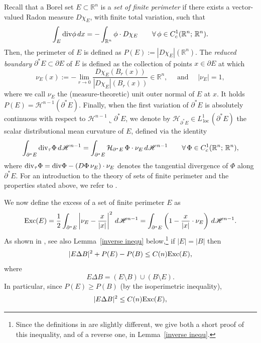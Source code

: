 \documentclass[reqno,11pt]{amsart}
\def\loc{{\mathop\mathrm{\,loc\,}}}
\numberwithin{equation}{section}
\theoremstyle{remark}
\begin{document}
Recall that a Borel set $E\subset \mathbb R^n$ is a \emph{set of finite perimeter} if there exists a vector-valued Radon measure $D\chi_E$, with finite total variation,  such that 
$$\int_{E}{\rm div} \phi\, dx=- \int_{\mathbb R^n} \phi \cdot D\chi_{E}\qquad \forall\, \phi\in C_c^1(\mathbb R^n;\,\mathbb R^n). $$
Then, the perimeter of $E$ is defined as $P(E):=|D\chi_E|(\mathbb R^n)$. 
The \emph{reduced boundary} $\partial^*E\subset\partial E$ of $E$ is defined as the collection of points 
$x\in \partial E$ at which
$$\nu_E(x):=-\lim_{r\to 0} \frac{D\chi_E(B_r(x))}{|D\chi_E|(B_r(x))}\in \mathbb R^n, \quad \text{ and } \quad |\nu_E|=1,$$
where we call $\nu_E$ the (measure-theoretic) unit outer normal of $E$ at $x$. 
It holds $P(E)=\mathscr H^{n-1}(\partial^*E)$.
Finally, when the first variation of $\partial^*E$ is absolutely continuous with respect to $\mathscr H^{n-1}\llcorner\partial^*E$, we denote by
$\mathcal H_{\partial^* E}\in L^1_\loc(\partial^* E)$ the scalar distributional mean curvature of $E$, defined via the identity
$$\int_{\partial^* E} {\rm div}_\tau \Phi \, d\mathscr H^{n-1} = \int_{\partial^* E} \mathcal H_{\partial^* E} \, \Phi\cdot \nu_E\, d\mathscr H^{n-1} \qquad \forall\, \Phi\in C_c^1(\mathbb R^n;\,\mathbb R^n), $$
where 
${\rm div}_\tau \Phi = {\rm div} \Phi - (D\Phi\, \nu_E) \cdot \nu_E$
denotes the tangential divergence of $\Phi$ along $\partial^*E$.
For an introduction to the theory of sets of finite perimeter and the properties stated above, we refer to  \cite[Sections 12-15]{M2012}.

\smallskip


We now define the excess of a set of finite perimeter $E$ as
$${\rm Exc}(E)=\frac{1}{2}\int_{\partial^*E} \left|\nu_E - \frac{x}{|x|}\right|^2 \, d\mathscr H^{n-1}=\int_{\partial^*E} \left(1- \frac{x}{|x|}\cdot \nu_E \right) \, d\mathscr H^{n-1}.$$
As shown in \cite[Proposition 1.2]{FJ2014}, see also Lemma~\ref{inverse inequ} below,\footnote{Since the definitions in \cite{FJ2014} are slightly different, we give both a short proof of this inequality, and of a reverse one, in Lemma~\ref{inverse inequ}.}
 if $|E|=|B|$ then
 \begin{align}
|E\Delta B|^2 + P(E)-P(B) \le C(n) {\rm Exc}(E), \label{difference perimeter}
\end{align}
where 
$$E\Delta B=(E\setminus B)\cup (B\setminus E). $$
 In particular, since $P(E)\geq P(B)$ (by the isoperimetric inequality), 
  \begin{align}
|E\Delta B|^2 \le C(n) {\rm Exc}(E),  \label{exc symm diff}
\end{align}
\end{document}
